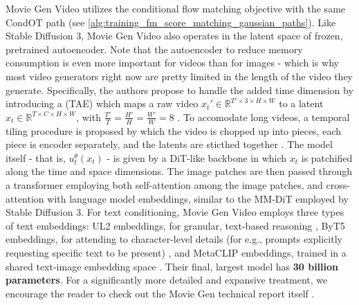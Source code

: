 Movie Gen Video utilizes the conditional flow matching objective with the same CondOT path (see \cref{alg:training_fm_score_matching_gaussian_paths}). Like Stable Diffusion 3, Movie Gen Video also operates in the latent space of frozen, pretrained autoencoder. Note that the autoencoder to reduce memory consumption is even more important for videos than for images - which is why most video generators right now are pretty limited in the length of the video they generate.
Specifically, the authors propose to handle the added time dimension by introducing a  (TAE) which maps a raw video $x_t' \in \mathbb{R}^{T' \times 3 \times H \times W}$ to a latent $x_t\in\mathbb{R}^{T \times C \times H \times W}$, with $\tfrac{T'}{T} = \tfrac{H'}{H} = \tfrac{W'}{W} = 8$ \cite{moviegen}. To accomodate long videos, a temporal tiling procedure is proposed by which the video is chopped up into pieces, each piece is encoder separately, and the latents are sticthed together \cite{moviegen}. The model itself - that is, $u_t^\theta(x_t)$ - is given by a DiT-like backbone in which $x_t$ is patchified along the time and space dimensions. The image patches are then passed through a transformer employing both self-attention among the image patches, and cross-attention with language model embeddings, similar to the MM-DiT employed by Stable Diffusion 3. For text conditioning, Movie Gen Video employs three types of text embeddings: UL2 embeddings, for granular, text-based reasoning \cite{ul2}, ByT5 embeddings, for attending to character-level details (for e.g., prompts explicitly requesting specific text to be present) \cite{byte5}, and MetaCLIP embeddings, trained in a shared text-image embedding space \cite{metaclip, moviegen}. Their final, largest model has \textbf{30 billion parameters}. For a significantly more detailed and expansive treatment, we encourage the reader to check out the Movie Gen technical report itself \citep{moviegen}.

